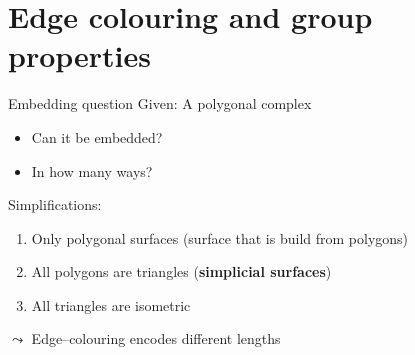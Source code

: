 \section{Edge colouring and group properties}
\newcommand{\colA}{blue}
\newcommand{\colB}{red}
\newcommand{\colC}{green!80!black}
\newcommand{\width}{very thick}
\frame{\tableofcontents[currentsection]}


\begin{frame}{Embedding question}
    \pause
    Given: A polygonal complex
    \begin{itemize}
        \pause
        \item Can it be embedded?
        \pause
        \item In how many ways?
    \end{itemize}
    \pause
    Simplifications:
    \begin{enumerate}
        \pause
        \item Only polygonal surfaces (surface that is build from polygons)
        \pause
        \item All polygons are triangles (\textbf{simplicial surfaces})
        \pause
        \item All triangles are isometric
    \end{enumerate}
    \pause
    $\leadsto$ Edge--colouring encodes different lengths
            \begin{center}
            \end{center}
\end{frame}


